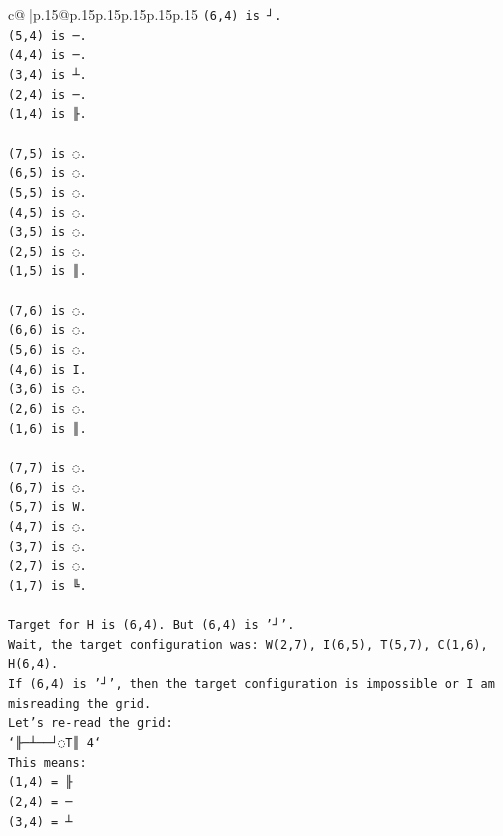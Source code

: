 \documentclass{article}
\begin{document}
{\begin{supertabular}{c@{$\;$}|p{.15\linewidth}@{}p{.15\linewidth}p{.15\linewidth}p{.15\linewidth}p{.15\linewidth}p{.15\linewidth}}
{{{\texttt{(6,4) is ┘.} \\
\texttt{(5,4) is ─.} \\
\texttt{(4,4) is ─.} \\
\texttt{(3,4) is ┴.} \\
\texttt{(2,4) is ─.} \\
\texttt{(1,4) is ╟.} \\
\\ 
\texttt{(7,5) is ◌.} \\
\texttt{(6,5) is ◌.} \\
\texttt{(5,5) is ◌.} \\
\texttt{(4,5) is ◌.} \\
\texttt{(3,5) is ◌.} \\
\texttt{(2,5) is ◌.} \\
\texttt{(1,5) is ║.} \\
\\ 
\texttt{(7,6) is ◌.} \\
\texttt{(6,6) is ◌.} \\
\texttt{(5,6) is ◌.} \\
\texttt{(4,6) is I.} \\
\texttt{(3,6) is ◌.} \\
\texttt{(2,6) is ◌.} \\
\texttt{(1,6) is ║.} \\
\\ 
\texttt{(7,7) is ◌.} \\
\texttt{(6,7) is ◌.} \\
\texttt{(5,7) is W.} \\
\texttt{(4,7) is ◌.} \\
\texttt{(3,7) is ◌.} \\
\texttt{(2,7) is ◌.} \\
\texttt{(1,7) is ╚.} \\
\\ 
\texttt{Target for H is (6,4). But (6,4) is '┘'.} \\
\texttt{Wait, the target configuration was: W(2,7), I(6,5), T(5,7), C(1,6), H(6,4).} \\
\texttt{If (6,4) is '┘', then the target configuration is impossible or I am misreading the grid.} \\
\texttt{Let's re{-}read the grid:} \\
\texttt{`╟─┴──┘◌T║ 4`} \\
\texttt{This means:} \\
\texttt{(1,4) = ╟} \\
\texttt{(2,4) = ─} \\
\texttt{(3,4) = ┴} \\
}}}
\end{supertabular}}
\end{document}
